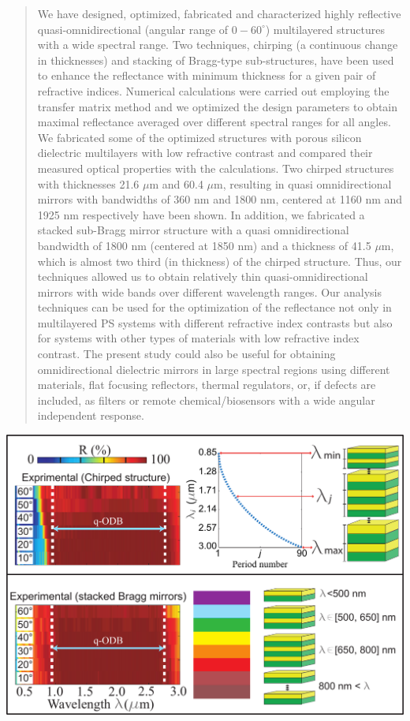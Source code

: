 \documentclass[a4paper,fleqn]{cas-sc}
\begin{document}
\begin{abstract}
We have designed, optimized, fabricated and characterized highly
reflective quasi-omnidirectional (angular range of $0-60^\circ$)
multilayered structures with a wide spectral range. Two techniques,
chirping (a continuous change in thicknesses) and stacking of
Bragg-type sub-structures, have been used to enhance the
reflectance with minimum thickness for a given pair of refractive
indices. Numerical calculations were carried out employing the
transfer matrix method and we optimized the design parameters to
obtain maximal reflectance averaged over different spectral ranges
for all angles. We fabricated some of the optimized structures with
porous silicon dielectric multilayers with low refractive contrast
and compared their measured  optical properties with the
calculations. Two chirped structures with thicknesses 21.6 $\mu$m
and 60.4 $\mu$m, resulting in quasi omnidirectional mirrors with
bandwidths of 360 nm and 1800 nm, centered at 1160 nm and 1925 nm
respectively have been shown. In addition, we fabricated a stacked
sub-Bragg mirror structure  with a quasi omnidirectional bandwidth
of 1800 nm (centered at 1850 nm) and a thickness of 41.5 $\mu$m,
which is almost two third (in thickness) of the chirped structure.
Thus, our techniques allowed us to obtain relatively thin
quasi-omnidirectional mirrors with wide bands over different
wavelength ranges. Our analysis techniques can be used for the
optimization of the reflectance not only in multilayered PS
systems  with different refractive index contrasts but also for
systems with other types of materials with low refractive index
contrast. The present study could also be useful for obtaining
omnidirectional dielectric mirrors in large spectral regions using
different materials,  flat focusing reflectors, thermal regulators,
or, if defects are included, as filters or remote
chemical/biosensors with a wide angular independent response.
\end{abstract}

\begin{graphicalabstract}
  \includegraphics[width=\textwidth]{GraphicalAbstract.pdf}
\end{graphicalabstract}
\end{document}
